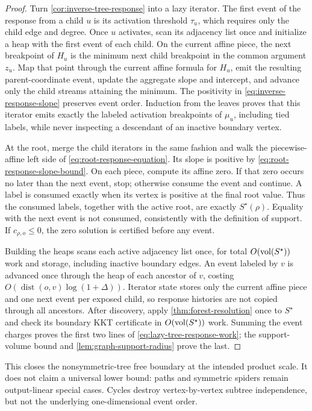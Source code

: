 \begin{proof}
Turn \cref{cor:inverse-tree-response} into a lazy iterator.  The first event
of the response from a child $u$ is its activation threshold $\tau_u$, which
requires only the child edge and degree.  Once $u$ activates, scan its
adjacency list once and initialize a heap with the first event of each child.
On the current affine piece, the next breakpoint of $H_u$ is the minimum next
child breakpoint in the common argument $z_u$.  Map that point through the
current affine formula for $H_u$, emit the resulting parent-coordinate event,
update the aggregate slope and intercept, and advance only the child streams
attaining the minimum.  The positivity in
\cref{eq:inverse-response-slope} preserves event order.  Induction from the
leaves proves that this iterator emits exactly the labeled activation
breakpoints of $\mu_u$, including tied labels, while never inspecting a
descendant of an inactive boundary vertex.

At the root, merge the child iterators in the same fashion and walk the
piecewise-affine left side of \cref{eq:root-response-equation}.  Its slope is
positive by \cref{eq:root-response-slope-bound}.  On each piece, compute its
affine zero.  If that zero occurs no later than the next event, stop; otherwise
consume the event and continue.  A label is consumed exactly when its vertex
is positive at the final root value.  Thus the consumed labels, together with
the active root, are exactly $S^\star(\rho)$.  Equality with the next event is
not consumed, consistently with the definition of support.  If
$c_{\rho,o}\leq0$, the zero solution is certified before any event.

Building the heaps scans each active adjacency list once, for total
$O(\operatorname{vol}(S^\star))$ work and storage, including inactive boundary edges.  An
event labeled by $v$ is advanced once through the heap of each ancestor of
$v$, costing
$O(\operatorname{dist}(o,v)\log(1+\Delta))$.  Iterator state stores only the current affine
piece and one next event per exposed child, so response histories are not
copied through all ancestors.  After discovery, apply
\cref{thm:forest-resolution} once to $S^\star$ and check its boundary KKT
certificate in $O(\operatorname{vol}(S^\star))$ work.  Summing the event charges proves the
first two lines of \cref{eq:lazy-tree-response-work}; the support-volume bound
and \cref{lem:graph-support-radius} prove the last.
\end{proof}

This closes the nonsymmetric-tree free boundary at the intended product
scale.  It does not claim a universal lower bound: paths and symmetric
spiders remain output-linear special cases.  Cycles destroy vertex-by-vertex
subtree independence, but not the underlying one-dimensional event order.
